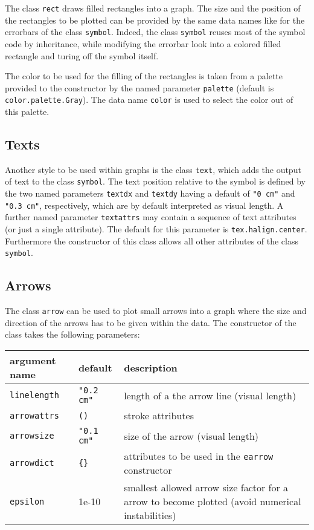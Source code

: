 The class \verb|rect| draws filled rectangles into a graph. The size
and the position of the rectangles to be plotted can be provided by
the same data names like for the errorbars of the class \verb|symbol|.
Indeed, the class \verb|symbol| reuses most of the symbol code by
inheritance, while modifying the errorbar look into a colored filled
rectangle and turing off the symbol itself.

The color to be used for the filling of the rectangles is taken from a
palette provided to the constructor by the named parameter
\verb|palette| (default is \verb|color.palette.Gray|). The data
name \verb|color| is used to select the color out of this palette.

\subsection{Texts}

Another style to be used within graphs is the class \verb|text|, which
adds the output of text to the class \verb|symbol|. The text
position relative to the symbol is defined by the two named
parameters \verb|textdx| and \verb|textdy| having a default of
\verb|"0 cm"| and \verb|"0.3 cm"|, respectively, which are by default
interpreted as visual length. A further named parameter
\verb|textattrs| may contain a sequence of text attributes (or just a
single attribute). The default for this parameter is
\verb|tex.halign.center|. Furthermore the constructor of this class
allows all other attributes of the class \verb|symbol|.

\subsection{Arrows}

The class \verb|arrow| can be used to plot small arrows into a graph
where the size and direction of the arrows has to be given within the
data. The constructor of the class takes the following parameters:

\medskip
\begin{tabularx}{\linewidth}{ll>{\raggedright\arraybackslash}X}
argument name&default&description\\
\hline
\texttt{linelength}&\texttt{"0.2 cm"}&length of a the arrow line (visual length)\\
\texttt{arrowattrs}&\texttt{()}&stroke attributes\\
\texttt{arrowsize}&\texttt{"0.1 cm"}&size of the arrow (visual length)\\
\texttt{arrowdict}&\texttt{\{\}}&attributes to be used in the \texttt{earrow} constructor\\
\texttt{epsilon}&1e-10&smallest allowed arrow size factor for a arrow to become plotted (avoid numerical instabilities)\\
\end{tabularx}
\medskip

